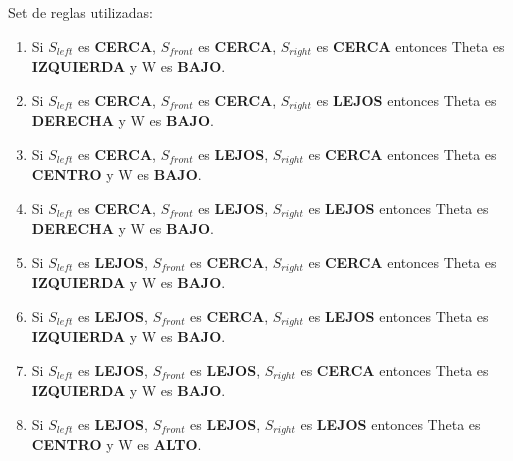 Set de reglas utilizadas:
\begin{enumerate}
    \item Si $S_{left}$ es \textbf{CERCA}, $S_{front}$ es \textbf{CERCA}, $S_{right}$ es \textbf{CERCA} entonces Theta es \textbf{IZQUIERDA} y W es \textbf{BAJO}.
    \item Si $S_{left}$ es \textbf{CERCA}, $S_{front}$ es \textbf{CERCA}, $S_{right}$ es \textbf{LEJOS} entonces Theta es \textbf{DERECHA} y W es \textbf{BAJO}.
    \item Si $S_{left}$ es \textbf{CERCA}, $S_{front}$ es \textbf{LEJOS}, $S_{right}$ es \textbf{CERCA} entonces Theta es \textbf{CENTRO} y W es \textbf{BAJO}.
    \item Si $S_{left}$ es \textbf{CERCA}, $S_{front}$ es \textbf{LEJOS}, $S_{right}$ es \textbf{LEJOS} entonces Theta es \textbf{DERECHA} y W es \textbf{BAJO}.
    \item Si $S_{left}$ es \textbf{LEJOS}, $S_{front}$ es \textbf{CERCA}, $S_{right}$ es \textbf{CERCA} entonces Theta es \textbf{IZQUIERDA} y W es \textbf{BAJO}.
    \item Si $S_{left}$ es \textbf{LEJOS}, $S_{front}$ es \textbf{CERCA}, $S_{right}$ es \textbf{LEJOS} entonces Theta es \textbf{IZQUIERDA} y W es \textbf{BAJO}.
    \item Si $S_{left}$ es \textbf{LEJOS}, $S_{front}$ es \textbf{LEJOS}, $S_{right}$ es \textbf{CERCA} entonces Theta es \textbf{IZQUIERDA} y W es \textbf{BAJO}.
    \item Si $S_{left}$ es \textbf{LEJOS}, $S_{front}$ es \textbf{LEJOS}, $S_{right}$ es \textbf{LEJOS} entonces Theta es \textbf{CENTRO} y W es \textbf{ALTO}.
\end{enumerate}